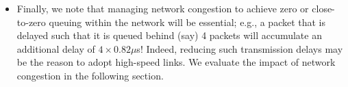\begin{itemize}[leftmargin=*]
	\item Finally, we note that managing network congestion to achieve zero or close-to-zero queuing within the network will be essential; e.g., a packet that is delayed such that it is queued behind (say) 4 packets will accumulate an additional delay of $4\times0.82\mu$s! 
	Indeed, reducing such transmission delays may be the reason to adopt high-speed links. We evaluate the impact of network congestion in the following section.

\end{itemize} 

